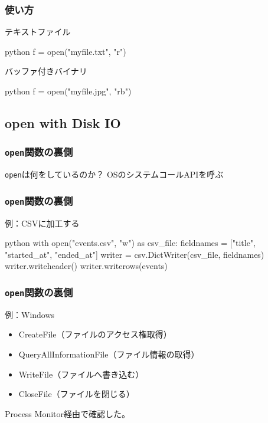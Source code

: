 \documentclass[dvipdfmx,12pt,notheorems]{beamer}
\theoremstyle{definition}
\begin{document}
\begin{frame}[fragile]\frametitle{使い方}

\begin{exampleblock}{テキストファイル}
\begin{pygments}{python}
f = open("myfile.txt", "r")
\end{pygments}
\end{exampleblock}

\begin{exampleblock}{バッファ付きバイナリ}
\begin{pygments}{python}
f = open("myfile.jpg", "rb")
\end{pygments}
\end{exampleblock}

\end{frame}

\subsection{open with Disk IO}

\begin{frame}\frametitle{\texttt{open}関数の裏側}
\begin{block}{\texttt{open}は何をしているのか？}
OSのシステムコールAPIを呼ぶ
\end{block}
\end{frame}

\begin{frame}[fragile]\frametitle{\texttt{open}関数の裏側}

\begin{exampleblock}{例：CSVに加工する}
\begin{pygments}{python}
with open("events.csv", "w") as csv_file:
    fieldnames = ["title", "started_at", "ended_at"]
    writer = csv.DictWriter(csv_file, fieldnames)
    writer.writeheader()
    writer.writerows(events)
\end{pygments}
\end{exampleblock}

\end{frame}

\begin{frame}[fragile]\frametitle{\texttt{open}関数の裏側}

\begin{exampleblock}{例：Windows}
\begin{itemize}
\item CreateFile（ファイルのアクセス権取得）
\item QueryAllInformationFile（ファイル情報の取得）
\item WriteFile（ファイルへ書き込む）
\item CloseFile（ファイルを閉じる）
\end{itemize}
\end{exampleblock}
Process Monitor経由で確認した。
\end{frame}
\end{document}
